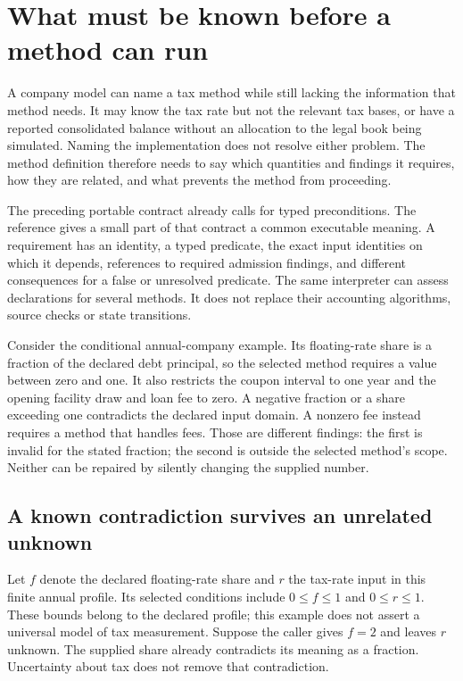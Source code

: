 \section{What must be known before a method can run}
\label{sec:method-requirement-language}

A company model can name a tax method while still lacking the information that
method needs. It may know the tax rate but not the relevant tax bases, or have a
reported consolidated balance without an allocation to the legal book being
simulated. Naming the implementation does not resolve either problem. The
method definition therefore needs to say which quantities and findings it
requires, how they are related, and what prevents the method from proceeding.

The preceding portable contract already calls for typed preconditions. The
 reference gives a small part of that contract a
common executable meaning. A requirement has an identity, a typed predicate,
the exact input identities on which it depends, references to required admission
findings, and different consequences for a false or unresolved predicate.
The same interpreter can assess declarations for several methods. It does not
replace their accounting algorithms, source checks or state transitions.

Consider the conditional annual-company example. Its floating-rate share is a
fraction of the declared debt principal, so the selected method requires a
value between zero and one. It also restricts the coupon interval to one year
and the opening facility draw and loan fee to zero. A negative fraction or a
share exceeding one contradicts the declared input domain. A nonzero fee instead
requires a method that handles fees. Those are different findings: the first
is invalid for the stated fraction; the second is outside the selected method's
scope. Neither can be repaired by silently changing the supplied number.

\subsection{A known contradiction survives an unrelated unknown}

Let $f$ denote the declared floating-rate share and $r$ the tax-rate input in
this finite annual profile. Its selected conditions include $0\leq f\leq1$
and $0\leq r\leq1$. These bounds belong to the declared profile; this example
does not assert a universal model of tax measurement. Suppose the caller gives
$f=2$ and leaves $r$ unknown. The supplied share already contradicts its meaning
as a fraction. Uncertainty about tax does not remove that contradiction.

